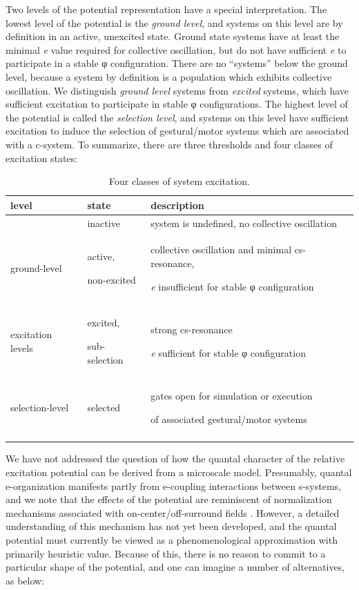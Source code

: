   Two levels of the potential representation have a special  interpretation. The lowest level of the potential is the \textit{ground level}, and systems on this level are by definition in an active, unexcited state. Ground state systems have at least the minimal \textit{e} value required for collective oscillation, but do not have sufficient \textit{e} to participate in a stable φ configuration. There are no “systems” below the ground level, because a system by definition is a population which exhibits collective oscillation. We distinguish \textit{ground level} systems from \textit{excited} systems, which have sufficient excitation to participate in stable φ configurations. The highest level of the potential is called the \textit{selection level}, and systems on this level have sufficient excitation to induce the selection of gestural/motor systems which are associated with a c-system. To summarize, there are three thresholds and four classes of excitation states:

\begin{table}
\begin{tabularx}{\textwidth}{llQ}
\lsptoprule
\textbf{level} & \textbf{state} & \textbf{description}\\
\midrule 
& inactive & system is undefined, no collective oscillation\\
\raggedleft ground-level & active,

non-excited & collective oscillation and minimal cs-resonance, 

\textit{e} insufficient for stable φ configuration\\
\raggedleft excitation levels & excited,

sub-selection & strong cs-resonance

\textit{e} sufficient for stable φ configuration\\
\raggedleft selection-level & selected & gates open for simulation or execution 

of associated gestural/motor systems\\
\lspbottomrule
\end{tabularx}
\caption{Four classes of system excitation.}\label{tab:1:2}
\end{table}
 
 We have not addressed the question of how the quantal character of the relative excitation potential can be derived from a microscale model. Presumably, quantal e-organization manifests partly from e-coupling interactions between s-systems, and we note that the effects of the potential are reminiscent of normalization mechanisms associated with on-center/off-surround fields \citep{Grossberg1978,Grossberg1987}. However, a detailed understanding of this mechanism has not yet been developed, and the quantal potential must currently be viewed as a phenomenological approximation with primarily heuristic value. Because of this, there is no reason to commit to a particular shape of the potential, and one can imagine a number of alternatives, as below:

